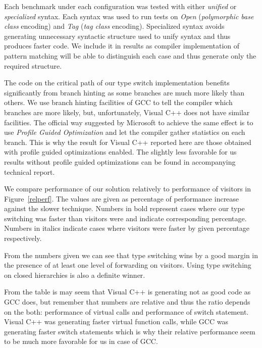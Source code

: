\documentclass[preprint]{sigplanconf}
\begin{document}
Each benchmark under each configuration was tested with either \emph{unified} 
or \emph{specialized} syntax. Each syntax was used to run tests on \emph{Open} 
(\emph{polymorphic base class} encoding) and \emph{Tag} (\emph{tag class} 
encoding). Specialized syntax avoids generating unnecessary syntactic structure 
used to unify syntax and thus produces faster code. We include it in results as 
compiler implementation of pattern matching will be able to distinguish each 
case and thus generate only the required structure.

The code on the critical path of our type switch implementation benefits 
significantly from branch hinting as some branches are much more likely than 
others. We use branch hinting facilities of GCC to tell the compiler which 
branches are more likely, but, unfortunately, Visual C++ does not have similar 
facilities. The official way suggested by Microsoft to achieve the same effect 
is to use \emph{Profile Guided Optimization} and let the compiler gather 
statistics on each branch. This is why the result for Visual C++ reported here 
are those obtained with profile guided optimizations enabled. The slightly less 
favorable for us results without profile guided optimizations can be found in 
accompanying technical report\cite{TR}.

We compare performance of our solution relatively to performance of visitors in 
Figure~\ref{relperf}. The values are given as percentage of performance increase 
against the slower technique. Numbers in bold represent cases where our type 
switching was faster than visitors were and indicate corresponding percentage. 
Numbers in italics indicate cases where visitors were faster by given percentage
respectively.

From the numbers given we can see that type switching wins by a good margin in 
the presence of at least one level of forwarding on visitors. Using type 
switching on closed hierarchies is also a definite winner.

From the table is may seem that Visual C++ is generating not as good code as GCC 
does, but remember that numbers are relative and thus the ratio depends on the 
both: performance of virtual calls and performance of switch statement. Visual 
C++ was generating faster virtual function calls, while GCC was generating 
faster switch statements which is why their relative performance seem to be much 
more favorable for us in case of GCC.
\end{document}
